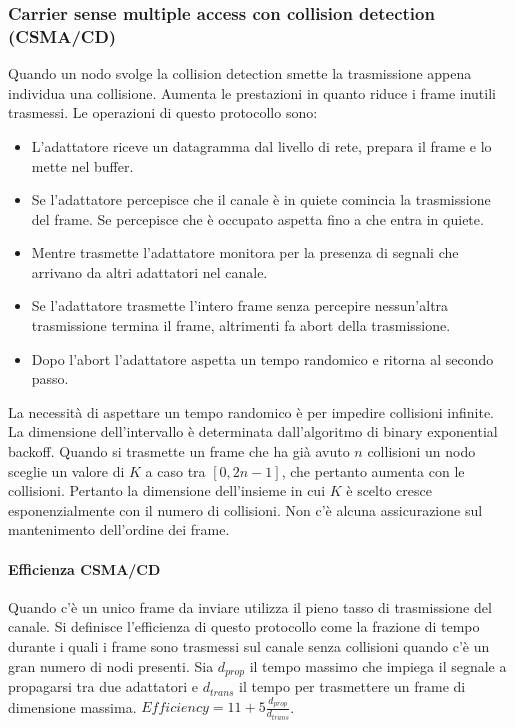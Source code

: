 \subsubsection{Carrier sense multiple access con collision detection (CSMA/CD)}
Quando un nodo svolge la collision detection smette la trasmissione appena individua una collisione. Aumenta le prestazioni in quanto riduce i frame inutili trasmessi. Le operazioni di questo protocollo sono:
\begin{itemize}
\item L'adattatore riceve un datagramma dal livello di rete, prepara il frame e lo mette nel buffer.
\item Se l'adattatore percepisce che il canale \`e in quiete comincia la trasmissione del frame. Se percepisce che \`e occupato aspetta fino a che entra in quiete.
\item Mentre trasmette l'adattatore monitora per la presenza di segnali che arrivano da altri adattatori nel canale.
\item Se l'adattatore trasmette l'intero frame senza percepire nessun'altra trasmissione termina il frame, altrimenti fa abort della trasmissione.
\item Dopo l'abort l'adattatore aspetta un tempo randomico e ritorna al secondo passo.
\end{itemize}
La necessit\`a di aspettare un tempo randomico \`e per impedire collisioni infinite. La dimensione dell'intervallo \`e determinata dall'algoritmo di binary exponential backoff. Quando si trasmette un frame che ha
gi\`a avuto $n$ collisioni un nodo sceglie un valore di $K$ a caso tra $[0,2n-1]$, che pertanto aumenta con le collisioni. Pertanto la dimensione dell'insieme in cui $K$ \`e scelto cresce esponenzialmente con il 
numero di collisioni. Non c'\`e alcuna assicurazione sul mantenimento dell'ordine dei frame. 
\paragraph{Efficienza CSMA/CD}
Quando c'\`e un unico frame da inviare utilizza il pieno tasso di trasmissione del canale. Si definisce l'efficienza di questo protocollo come la frazione di tempo durante i quali i frame sono trasmessi sul canale
senza collisioni quando c'\`e un gran numero di nodi presenti. Sia $d_{prop}$ il tempo massimo che impiega il segnale a propagarsi tra due adattatori e $d_{trans}$ il tempo per trasmettere un frame di 
dimensione massima. $Efficiency = 11 + 5\frac{d_{prop}}{d_{trans}}$. 

